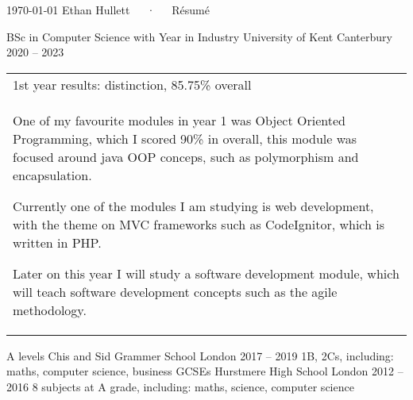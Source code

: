 \documentclass[]{awesome-cv}
\begin{document}
    

\makecvheader
\makecvfooter
  {\today}
  {Ethan Hullett~~~·~~~Résumé}
  {\thepage}

\begin{cventries}
    \cventry
    {BSc in Computer Science with Year in Industry}
	{University of Kent}
	{Canterbury}
	{2020 – 2023}
    {{\begin{tabular}{p{}}
        1st year results: distinction, 85.75\% overall   \\
        \begin{cvitems}
            \item {One of my favourite modules in year 1 was Object Oriented Programming, which I scored 90\% in overall, this module was focused around java OOP conceps, such as polymorphism and encapsulation.}
            \item {Currently one of the modules I am studying is web development, with the theme on MVC frameworks such as CodeIgnitor, which is written in PHP.}
            \item {Later on this year I will study a software development module, which will teach software development concepts such as the agile methodology.}
        \end{cvitems}
    \end{tabular}}
    }

    \cventry
	{A levels}
	{Chis and Sid Grammer School}
	{London}
	{2017 – 2019}
	{1B, 2Cs, including: maths, computer science, business}
	\cventry
	{GCSEs}
	{Hurstmere High School}
	{London}
	{2012 – 2016}
	{8 subjects at A grade, including: maths, science, computer science}
\end{cventries}
\end{document}
